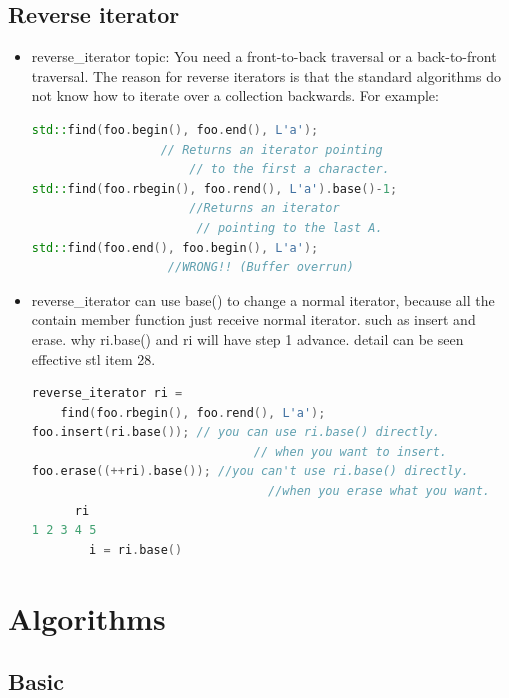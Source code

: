 \documentclass[a4paper,11pt,twoside]{book}
\begin{document}
\subsection{Reverse iterator}
\begin{itemize}
\item reverse\_iterator topic:
You need a front-to-back traversal or a back-to-front traversal. The reason for reverse iterators is that the standard algorithms do not know how to iterate over a collection backwards. For example:
\begin{lstlisting}[frame=single, language=c++]
std::find(foo.begin(), foo.end(), L'a');
                  // Returns an iterator pointing
                      // to the first a character.
std::find(foo.rbegin(), foo.rend(), L'a').base()-1;
                      //Returns an iterator
                       // pointing to the last A.
std::find(foo.end(), foo.begin(), L'a');
                   //WRONG!! (Buffer overrun)
\end{lstlisting}

\item reverse\_iterator can use base() to change a normal iterator, because all the contain member function just receive normal iterator. such as insert and erase.
why ri.base() and ri will have step 1 advance. detail can be seen effective stl item 28.
\begin{lstlisting}[frame=single, language=c++]
reverse_iterator ri =
    find(foo.rbegin(), foo.rend(), L'a');
foo.insert(ri.base()); // you can use ri.base() directly.
                               // when you want to insert.
foo.erase((++ri).base()); //you can't use ri.base() directly.
                                 //when you erase what you want.
      ri
1 2 3 4 5
        i = ri.base()
\end{lstlisting}



\end{itemize}

\section{Algorithms}

\subsection{Basic}
\end{document}
